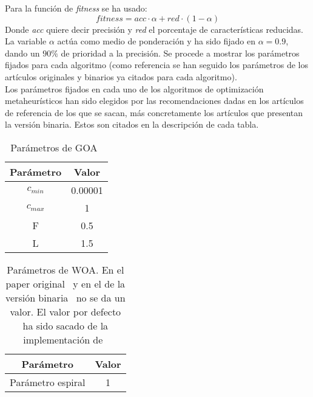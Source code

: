 Para la función de \textit{fitness} se ha usado:
\begin{equation}
    fitness = acc\cdot\alpha + red\cdot(1-\alpha)
    \label{eq:fitness}
\end{equation}
Donde \textit{acc} quiere decir precisión y \textit{red} el porcentaje de características reducidas. La variable $\alpha$ actúa como medio de ponderación y ha sido fijado en $\alpha=0.9$, dando un $90\%$ de prioridad a la precisión.
Se procede a mostrar los parámetros fijados para cada algoritmo (como referencia se han seguido los parámetros de los artículos originales y binarios ya citados para cada algoritmo).\\[6pt]
Los parámetros fijados en cada uno de los algoritmos de optimización metaheurísticos han sido elegidos por las recomendaciones dadas en los artículos de referencia de los que se sacan, más concretamente los artículos que presentan la versión binaria. Estos son citados en la descripción de cada tabla.

\begin{table}[htp]
    \centering
    \begin{tabular}{ c c }
        \hline
        \textbf{Parámetro} & \textbf{Valor} \\
        \hline
        $c_{min}$          & 0.00001        \\
        $c_{max}$          & 1              \\
        F                  & 0.5            \\
        L                  & 1.5            \\
        \hline
    \end{tabular}
    \caption{Parámetros de GOA~\cite{mafarja_binary_2019}}
\end{table}

\begin{table}[htp]
    \centering
    \begin{tabular}{ c c }
        \hline
        \textbf{Parámetro} & \textbf{Valor} \\
        \hline
        Parámetro espiral  & 1              \\
        \hline
    \end{tabular}
    \caption{Parámetros de WOA. En el paper original~\cite{mirjalili_whale_2016} y en el de la versión binaria~\cite{mafarja_whale_2018} no se da un valor. El valor por defecto ha sido sacado de la implementación de~\cite{Li2019AnAW}}
\end{table}

